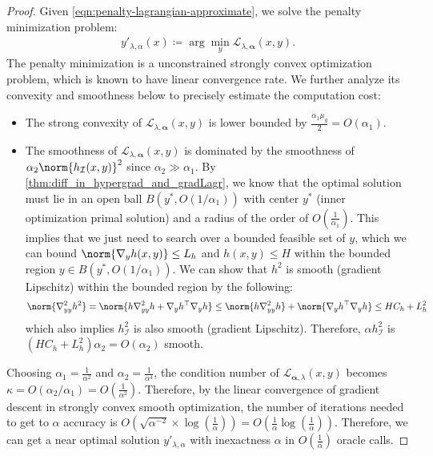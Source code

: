 \begin{proof}
    Given \cref{eqn:penalty-lagrangian-approximate}, we solve the penalty minimization problem: 
    \begin{align*}
        y'_{\lambda, \alpha}(x) \coloneqq \arg\min_y \mathcal{L}_{\lambda,\boldsymbol{\alpha}}(x,y). 
    \end{align*}
    The penalty minimization is a unconstrained strongly convex optimization problem, which is known to have linear convergence rate. We further analyze its convexity and smoothness below to precisely estimate the computation cost:
    \begin{itemize}
        \item The strong convexity of $\mathcal{L}_{\lambda,\boldsymbol{\alpha}}(x,y)$ is lower bounded by $\frac{\alpha_1 \mu_g}{2} = O(\alpha_1)$.
        \item The smoothness of $\mathcal{L}_{\lambda,\boldsymbol{\alpha}}(x,y)$ is dominated by the smoothness of $\alpha_2 \norm{h_\mathcal{I}(x,y)}^2$ since $\alpha_2 \gg \alpha_1$. By \cref{thm:diff_in_hypergrad_and_gradLagr}, we know that the optimal solution must lie in an open ball $B(y^*, O(1/\alpha_1))$ with center $y^*$ (inner optimization primal solution) and a radius of the order of $O(\frac{1}{\alpha_1})$. This implies that we just need to search over a bounded feasible set of $y$, which we can bound $\norm{\nabla_y h(x,y)} \leq L_h$ and $h(x,y) \leq H$ within the bounded region $y \in B(y^*, O(1/\alpha_1))$. We can show that $h^2$ is smooth (gradient Lipschitz) within the bounded region by the following:
        \begin{align}
            \norm{\nabla^2_{yy} h^2} = \norm{h \nabla^2_{yy} h + \nabla_y h^\top \nabla_y h} \leq \norm{h \nabla^2_{yy} h} + \norm{\nabla_y h^\top \nabla_y h} \leq H C_h + L_h^2 \nonumber
        \end{align}
        which also implies $h^2_{\mathcal{I}}$ is also smooth (gradient Lipschitz).
        Therefore, $\alpha h^2_{\mathcal{I}}$ is $( H C_h + L_h^2) \alpha_2 = O(\alpha_2)$ smooth.
    \end{itemize}
     
    Choosing $\alpha_1 = \frac{1}{\alpha^2}$ and $\alpha_2 = \frac{1}{\alpha^4}$, the condition number of $\mathcal{L}_{\boldsymbol{\alpha}, \lambda}(x,y)$ becomes $\kappa = O(\alpha_2 / \alpha_1) = O(\frac{1}{\alpha^2})$.
    Therefore, by the linear convergence of gradient descent in strongly convex smooth optimization, the number of iterations needed to get to $\alpha$ accuracy is $O(\sqrt{\alpha^{-2}} \times \log (\frac{1}{\alpha})) = O(\frac{1}{\alpha} \log (\frac{1}{\alpha}))$.
    Therefore, we can get a near optimal solution $y'_{\lambda,\alpha}$ with inexactness $\alpha$ in $O(\frac{1}{\alpha})$ oracle calls.


\end{proof}
